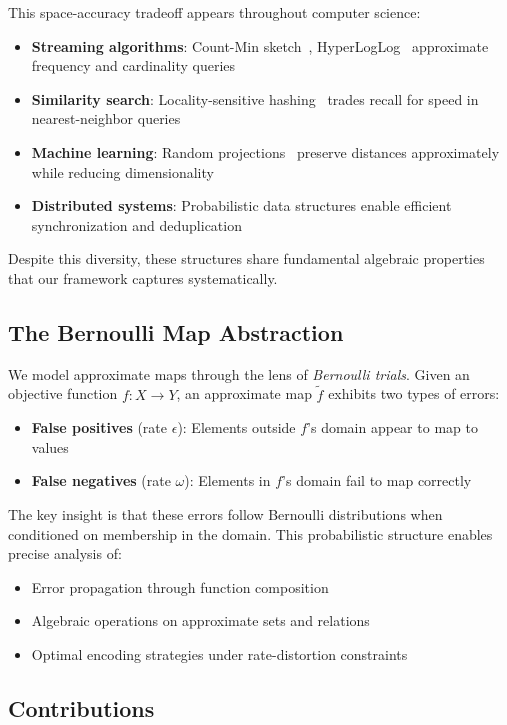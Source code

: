 This space-accuracy tradeoff appears throughout computer science:
\begin{itemize}
    \item \textbf{Streaming algorithms}: Count-Min sketch~\cite{cormode2005}, HyperLogLog~\cite{flajolet2007} approximate frequency and cardinality queries
    \item \textbf{Similarity search}: Locality-sensitive hashing~\cite{indyk1998} trades recall for speed in nearest-neighbor queries
    \item \textbf{Machine learning}: Random projections~\cite{johnson1984} preserve distances approximately while reducing dimensionality
    \item \textbf{Distributed systems}: Probabilistic data structures enable efficient synchronization and deduplication
\end{itemize}

Despite this diversity, these structures share fundamental algebraic properties that our framework captures systematically.

\subsection{The Bernoulli Map Abstraction}

We model approximate maps through the lens of \emph{Bernoulli trials}.
Given an objective function $f: X \to Y$, an approximate map $\tilde{f}$ exhibits two types of errors:
\begin{itemize}
    \item \textbf{False positives} (rate $\epsilon$): Elements outside $f$'s domain appear to map to values
    \item \textbf{False negatives} (rate $\omega$): Elements in $f$'s domain fail to map correctly
\end{itemize}

The key insight is that these errors follow Bernoulli distributions when conditioned on membership in the domain.
This probabilistic structure enables precise analysis of:
\begin{itemize}
    \item Error propagation through function composition
    \item Algebraic operations on approximate sets and relations
    \item Optimal encoding strategies under rate-distortion constraints
\end{itemize}

\subsection{Contributions}

